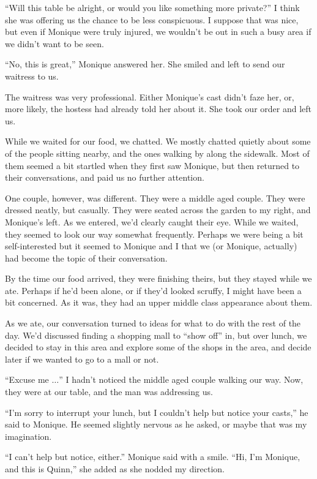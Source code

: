 ``Will this table be alright, or would you like something more private?'' I think she was
offering us the chance to be less conspicuous. I suppose that was nice, but even if Monique were
truly injured, we wouldn't be out in such a busy area if we didn't want to be seen.

``No, this is great,'' Monique answered her. She smiled and left to send our waitress to us.

The waitress was very professional. Either Monique's cast didn't faze her, or, more likely,
the hostess had already told her about it. She took our order and left us.

While we waited for our food, we chatted. We mostly chatted quietly about some of the
people sitting nearby, and the ones walking by along the sidewalk. Most of them seemed a bit
startled when they first saw Monique, but then returned to their conversations, and paid us no
further attention.

One couple, however, was different. They were a middle aged couple. They were dressed
neatly, but casually. They were seated across the garden to my right, and Monique's left. As we
entered, we'd clearly caught their eye. While we waited, they seemed to look our way somewhat
frequently. Perhaps we were being a bit self-interested but it seemed to Monique and I that we
(or Monique, actually) had become the topic of their conversation.

By the time our food arrived, they were finishing theirs, but they stayed while we ate.
Perhaps if he'd been alone, or if they'd looked scruffy, I might have been a bit concerned. As
it was, they had an upper middle class appearance about them.

As we ate, our conversation turned to ideas for what to do with the rest of the day. We'd
discussed finding a shopping mall to ``show off'' in, but over lunch, we decided to stay in this
area and explore some of the shops in the area, and decide later if we wanted to go to a mall or
not.

``Excuse me $\ldots$'' I hadn't noticed the middle aged couple walking our way. Now, they were
at our
table, and the man was addressing us.

``I'm sorry to interrupt your lunch, but I couldn't help but notice your casts,'' he said to
Monique. He seemed slightly nervous as he asked, or maybe that was my imagination.

``I can't help but notice, either.'' Monique said with a smile. ``Hi, I'm Monique, and this is
Quinn,'' she added as she nodded my direction.

